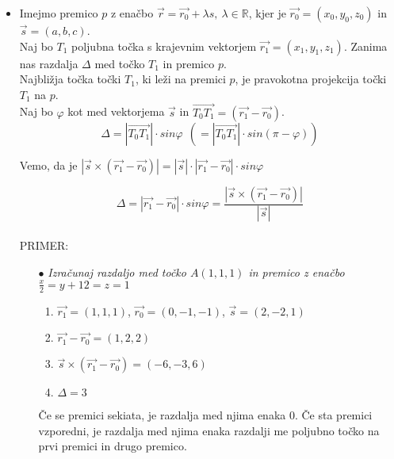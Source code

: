 \documentclass[a4paper,12pt]{article}
\begin{document}
\begin{itemize}
\item Imejmo premico $p$ z enačbo $\vec{r}=\vec{r_0}+\lambda s,~\lambda \in \mathbb{R}$, kjer je $\vec{r_0}=(x_0,y_0,z_0)$ in $\vec{s}=(a,b,c)$. \\

Naj bo $T_1$ poljubna točka s krajevnim vektorjem $\vec{r_1}=(x_1,y_1,z_1)$. Zanima nas razdalja $\Delta$ med točko $T_1$ in premico $p$. \\

Najbližja točka točki $T_1$, ki leži na premici $p$, je pravokotna projekcija točki $T_1$ na $p$. \\

Naj bo $\varphi$ kot med vektorjema $\vec{s}$ in $\overrightarrow{T_0 T_1}=(\vec{r_1} - \vec{r_0})$. \\
$$ \Delta =|\overrightarrow{T_0 T_1}|\cdot sin\varphi ~~(=|\overrightarrow{T_0 T_1}| \cdot sin(\pi - \varphi)) $$

Vemo, da je $|\vec{s} \times (\vec{r_1} - \vec{r_0})|=|\vec{s}| \cdot |\vec{r_1}-\vec{r_0}|\cdot sin\varphi $ 

$$ \Delta = |\vec{r_1}-\vec{r_0}|\cdot sin\varphi = \frac{|\vec{s}\times(\vec{r_1}-\vec{r_0})|}{|\vec{s}|} $$ \\


PRIMER: 
\begin{itemize}
\item[$\bullet$] \textit{Izračunaj razdaljo med točko $A(1,1,1)$ in premico z enačbo  \linebreak $\frac{x}{2}={y+1}{2}=z=1$} \\

\begin{enumerate}
\item $\vec{r_1}=(1,1,1)$, $\vec{r_0}=(0,-1,-1)$, $\vec{s}=(2,-2,1)$
\item $\vec{r_1}-\vec{r_0}=(1,2,2)$
\item $\vec{s}\times(\vec{r_1}-\vec{r_0})=(-6,-3,6)$
\item $\Delta=3$ \\
\end{enumerate}

Če se premici sekiata, je razdalja med njima enaka 0. 
Če sta premici vzporedni, je razdalja med njima enaka razdalji me poljubno točko na prvi premici in drugo premico.

\end{itemize}

\end{itemize}
\end{document}
